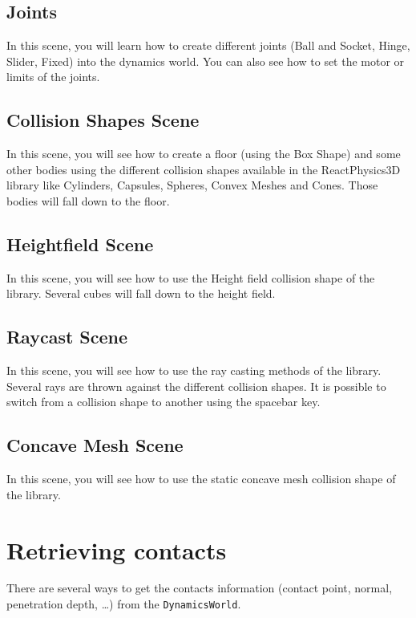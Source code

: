 \documentclass[a4paper,12pt]{article}
\begin{document}
    \subsection{Joints}

    In this scene, you will learn how to create different joints (Ball and Socket, Hinge, Slider, Fixed) into the dynamics world. You can also see how
    to set the motor or limits of the joints.

    \subsection{Collision Shapes Scene}

    In this scene, you will see how to create a floor (using the Box Shape) and some other bodies using the different collision shapes available
    in the ReactPhysics3D library like Cylinders, Capsules, Spheres, Convex Meshes and Cones. Those bodies will fall down to the floor.

    \subsection{Heightfield Scene}

    In this scene, you will see how to use the Height field collision shape of the library. Several cubes will fall
    down to the height field.

    \subsection{Raycast Scene}

    In this scene, you will see how to use the ray casting methods of the library. Several rays are thrown against the different collision shapes.
    It is possible to switch from a collision shape to another using the spacebar key.

    \subsection{Concave Mesh Scene}

    In this scene, you will see how to use the static concave mesh collision shape of the library.

    \section{Retrieving contacts}

    There are several ways to get the contacts information (contact point, normal, penetration depth, \dots) from the \texttt{DynamicsWorld}. \\
\end{document}
